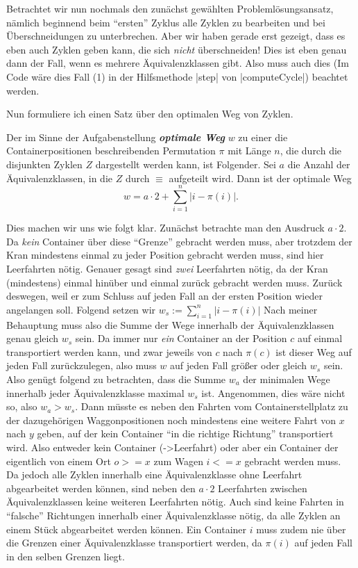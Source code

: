 Betrachtet wir nun nochmals den zunächst gewählten Problemlösungsansatz, nämlich beginnend beim ``ersten'' Zyklus alle Zyklen zu bearbeiten und bei Überschneidungen zu unterbrechen.
Aber wir haben gerade erst gezeigt, dass es eben auch Zyklen geben kann, die sich \emph{nicht} überschneiden!
Dies ist eben genau dann der Fall, wenn es mehrere Äquivalenzklassen gibt.
Also muss auch dies (Im Code wäre dies Fall (1) in der Hilfsmethode |step| von |computeCycle|) beachtet werden.

Nun formuliere ich einen Satz über den optimalen Weg von Zyklen.
\begin{center}
\begin{minipage}[c]{.8\textwidth}
 Der im Sinne der Aufgabenstellung \emph{\textbf{optimale Weg}} $w$ zu einer die Containerpositionen beschreibenden Permutation $\pi$ mit Länge $n$,
  die durch die disjunkten Zyklen $Z$ dargestellt werden kann, ist Folgender.
 Sei $a$ die Anzahl der Äquivalenzklassen, in die $Z$ durch $\equiv$ aufgeteilt wird.
 Dann ist der optimale Weg \[w = a \cdot 2 + \sum_{i = 1}^{n}{\lvert i-\pi(i)\rvert}. \]
\end{minipage}
\end{center}
Dies machen wir uns wie folgt klar. Zunächst betrachte man den Ausdruck $a \cdot 2$.
Da \emph{kein} Container über diese ``Grenze'' gebracht werden muss, aber trotzdem der Kran mindestens einmal zu jeder Position gebracht werden muss, sind hier Leerfahrten nötig.
Genauer gesagt sind \emph{zwei} Leerfahrten nötig, da der Kran (mindestens) einmal hinüber und einmal zurück gebracht werden muss.
Zurück deswegen, weil er zum Schluss auf jeden Fall an der ersten Position wieder angelangen soll.
Folgend setzen wir $w_s := \sum_{i = 1}^{n}{\lvert i-\pi(i)\rvert}$
Nach meiner Behauptung muss also die Summe der Wege innerhalb der Äquivalenzklassen genau gleich $w_s$ sein.
Da immer nur \emph{ein} Container an der Position $c$ auf einmal transportiert werden kann,
und zwar jeweils von $c$ nach $\pi(c)$ ist dieser Weg auf jeden Fall zurückzulegen, also muss $w$ auf jeden Fall größer oder gleich $w_s$ sein.
Also genügt folgend zu betrachten, dass die Summe $w_a$ der minimalen Wege innerhalb jeder Äquivalenzklasse maximal $w_s$ ist.
Angenommen, dies wäre nicht so, also $w_a > w_s$.
Dann müsste es neben den Fahrten vom Containerstellplatz zu der dazugehörigen Waggonpositionen noch mindestens eine weitere Fahrt von $x$ nach $y$ geben,
auf der kein Container ``in die richtige Richtung'' transportiert wird.
Also entweder kein Container (->Leerfahrt) oder aber ein Container der eigentlich von einem Ort $o >= x$ zum Wagen $i <= x$ gebracht werden muss.
Da jedoch alle Zyklen innerhalb eine Äquivalenzklasse ohne Leerfahrt abgearbeitet werden können,
sind neben den $a \cdot 2$ Leerfahrten zwischen Äquivalenzklassen keine weiteren Leerfahrten nötig.
Auch sind keine Fahrten in ``falsche'' Richtungen innerhalb einer Äquivalenzklasse nötig, da alle Zyklen an einem Stück abgearbeitet werden können. %
Ein Container $i$ muss zudem nie über die Grenzen einer Äquivalenzklasse transportiert werden, da $\pi(i)$ auf jeden Fall in den selben Grenzen liegt.

